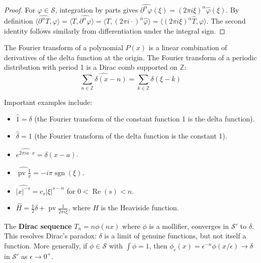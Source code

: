 \begin{proof}
For $\varphi \in \mathcal{S}$, integration by parts gives $\widehat{\partial^\alpha \varphi}(\xi) = (2\pi i \xi)^\alpha \hat{\varphi}(\xi)$. By definition $\langle \widehat{\partial^\alpha T}, \varphi \rangle = \langle T, \widehat{\partial^\alpha \varphi} \rangle = \langle T, (2\pi i \cdot)^\alpha \hat{\varphi} \rangle = \langle (2\pi i \xi)^\alpha \hat{T}, \varphi \rangle$. The second identity follows similarly from differentiation under the integral sign.
\end{proof}

\begin{corollary}
The Fourier transform of a polynomial $P(x)$ is a linear combination of derivatives of the delta function at the origin. The Fourier transform of a periodic distribution with period 1 is a Dirac comb supported on $\mathbb{Z}$:
\[\widehat{\sum_{n \in \mathbb{Z}} \delta(x-n)} = \sum_{k \in \mathbb{Z}} \delta(\xi - k)\]
\end{corollary}

\begin{example}
Important examples include:
\begin{itemize}
\item $\hat{1} = \delta$ (the Fourier transform of the constant function 1 is the delta function).
\item $\hat{\delta} = 1$ (the Fourier transform of the delta function is the constant 1).
\item $\widehat{e^{2\pi i a \cdot x}} = \delta(x - a)$.
\item $\widehat{\operatorname{pv}\frac{1}{x}} = -i\pi \operatorname{sgn}(\xi)$.
\item $\widehat{|x|^{-s}} = c_s |\xi|^{s-n}$ for $0 < \operatorname{Re}(s) < n$.
\item $\hat{H} = \frac{1}{2}\delta + \operatorname{pv}\frac{1}{2\pi i \xi}$, where $H$ is the Heaviside function.
\end{itemize}
\end{example}

The \textbf{Dirac sequence} $T_n = n \phi(nx)$ where $\phi$ is a mollifier, converges in $\mathcal{S}'$ to $\delta$. This resolves Dirac's paradox: $\delta$ is a limit of genuine functions, but not itself a function. More generally, if $\phi \in \mathcal{S}$ with $\int \phi = 1$, then $\phi_\epsilon(x) = \epsilon^{-n} \phi(x/\epsilon) \to \delta$ in $\mathcal{S}'$ as $\epsilon \to 0^+$.

